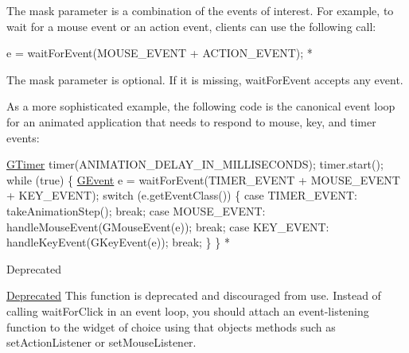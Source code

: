The mask parameter is a combination of the events of interest. For example, to wait for a mouse event or an action event, clients can use the following call\+:


\begin{DoxyPre}
     e = waitForEvent(MOUSE\_EVENT + ACTION\_EVENT);
*\end{DoxyPre}


The {\ttfamily mask} parameter is optional. If it is missing, {\ttfamily wait\+For\+Event} accepts any event.

As a more sophisticated example, the following code is the canonical event loop for an animated application that needs to respond to mouse, key, and timer events\+:


\begin{DoxyPre}
     \mbox{\hyperlink{classsgl_1_1GTimer}{GTimer}} timer(ANIMATION\_DELAY\_IN\_MILLISECONDS);
     timer.start();
     while (true) \{
        \mbox{\hyperlink{classsgl_1_1GEvent}{GEvent}} e = waitForEvent(TIMER\_EVENT + MOUSE\_EVENT + KEY\_EVENT);
        switch (e.getEventClass()) \{
         case TIMER\_EVENT:
           takeAnimationStep();
           break;
         case MOUSE\_EVENT:
           handleMouseEvent(GMouseEvent(e));
           break;
         case KEY\_EVENT:
           handleKeyEvent(GKeyEvent(e));
           break;
        \}
     \}
*\end{DoxyPre}


\begin{DoxyRefDesc}{Deprecated}
\item[\mbox{\hyperlink{deprecated__deprecated000005}{Deprecated}}]This function is deprecated and discouraged from use. Instead of calling wait\+For\+Click in an event loop, you should attach an event-\/listening function to the widget of choice using that object\textquotesingle{}s methods such as set\+Action\+Listener or set\+Mouse\+Listener. \end{DoxyRefDesc}
